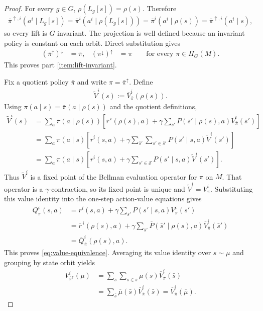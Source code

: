 \documentclass{article}
\theoremstyle{plain}
\theoremstyle{definition}
\theoremstyle{remark}
\newcommand{\St}{\mathcal{S}}
\newcommand{\quotient}[1]{\overline{#1}}
\newcommand{\Vbar}{\overline{V}}
\newcommand{\Qbar}{\overline{Q}}
\begin{document}
\begin{proof}
For every $g\in G$,
$\rho(L_g[s])=\rho(s)$. Therefore
\begin{align*}
  \bar\pi^{\uparrow,i}(a^i\mid L_g[s])
  =
  \bar\pi^i(a^i\mid\rho(L_g[s]))
  =
  \bar\pi^i(a^i\mid\rho(s))
  =
  \bar\pi^{\uparrow,i}(a^i\mid s),
\end{align*}
so every lift is $G$ invariant. The projection is well defined because an
invariant policy is constant on each orbit. Direct substitution gives
\begin{align*}
  (\bar\pi^\uparrow)^\downarrow
  &=
  \bar\pi,&
  (\pi^\downarrow)^\uparrow
  &=
  \pi
  \qquad
  \text{for every $\pi\in\Pi_G(M)$.}
\end{align*}
This proves part \ref{item:lift-invariant}.

Fix a quotient policy $\bar\pi$ and write $\pi=\bar\pi^\uparrow$. Define
\begin{align*}
  \widetilde V^i(s)
  :=
  \Vbar^i_{\bar\pi}(\rho(s)).
\end{align*}
Using $\pi(a\mid s)=\bar\pi(a\mid\rho(s))$ and the quotient definitions,
\begin{align*}
  \widetilde V^i(s)
  &=
  \sum_a\bar\pi(a\mid\rho(s))
  \left[
    \quotient r^{\,i}(\rho(s),a)
    +
    \gamma
    \sum_{\bar s'}
    \quotient P(\bar s'\mid\rho(s),a)
    \Vbar^i_{\bar\pi}(\bar s')
  \right]\\
  &=
  \sum_a\pi(a\mid s)
  \left[
    r^i(s,a)
    +
    \gamma
    \sum_{\bar s'}
    \sum_{s'\in\bar s'}
    P(s'\mid s,a)\widetilde V^i(s')
  \right]\\
  &=
  \sum_a\pi(a\mid s)
  \left[
    r^i(s,a)
    +
    \gamma
    \sum_{s'\in\St}P(s'\mid s,a)\widetilde V^i(s')
  \right].
\end{align*}
Thus $\widetilde V^i$ is a fixed point of the Bellman evaluation operator for
$\pi$ on $M$. That operator is a $\gamma$-contraction, so its fixed point is
unique and $\widetilde V^i=V^i_\pi$. Substituting this value identity into the
one-step action-value equations gives
\begin{align*}
  Q^i_\pi(s,a)
  &=
  r^i(s,a)+\gamma\sum_{s'}P(s'\mid s,a)V^i_\pi(s')\\
  &=
  \quotient r^{\,i}(\rho(s),a)
  +
  \gamma\sum_{\bar s'}
  \quotient P(\bar s'\mid\rho(s),a)
  \Vbar^i_{\bar\pi}(\bar s')\\
  &=
  \Qbar^i_{\bar\pi}(\rho(s),a).
\end{align*}
This proves \eqref{eq:value-equivalence}. Averaging its value identity over
$s\sim\mu$ and grouping by state orbit yields
\begin{align*}
  V^i_{\bar\pi^\uparrow}(\mu)
  &=
  \sum_{\bar s}
  \sum_{s\in\bar s}
  \mu(s)\Vbar^i_{\bar\pi}(\bar s)\\
  &=
  \sum_{\bar s}
  \quotient\mu(\bar s)\Vbar^i_{\bar\pi}(\bar s)
  =
  \Vbar^i_{\bar\pi}(\quotient\mu).
\end{align*}


\end{proof}
\end{document}

